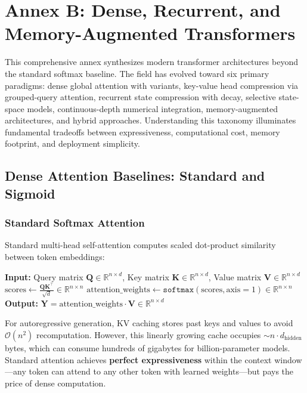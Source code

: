 \section{Annex B: Dense, Recurrent, and Memory-Augmented Transformers}
\label{sec:annex-transformer}

This comprehensive annex synthesizes modern transformer architectures beyond the standard softmax baseline. The field has evolved toward six primary paradigms: dense global attention with variants, key-value head compression via grouped-query attention, recurrent state compression with decay, selective state-space models, continuous-depth numerical integration, memory-augmented architectures, and hybrid approaches. Understanding this taxonomy illuminates fundamental tradeoffs between expressiveness, computational cost, memory footprint, and deployment simplicity.

\subsection{Dense Attention Baselines: Standard and Sigmoid}

\subsubsection{Standard Softmax Attention}
Standard multi-head self-attention \citep{vaswani_attention_2017} computes scaled dot-product similarity between token embeddings:

\begin{algorithmic}[1]
\State \textbf{Input:} Query matrix $\mathbf{Q} \in \mathbb{R}^{n \times d}$, Key matrix $\mathbf{K} \in \mathbb{R}^{n \times d}$, Value matrix $\mathbf{V} \in \mathbb{R}^{n \times d}$
\State $\text{scores} \gets \frac{\mathbf{Q}\mathbf{K}^\top}{\sqrt{d}} \in \mathbb{R}^{n \times n}$ 
\State $\text{attention\_weights} \gets \texttt{softmax}(\text{scores}, \text{axis}=1) \in \mathbb{R}^{n \times n}$ 
\State \textbf{Output:} $\mathbf{Y} = \text{attention\_weights} \cdot \mathbf{V} \in \mathbb{R}^{n \times d}$ 
\end{algorithmic}

For autoregressive generation, KV caching stores past keys and values to avoid $\mathcal{O}(n^2)$ recomputation. However, this linearly growing cache occupies $\sim n \cdot d_{\text{hidden}}$ bytes, which can consume hundreds of gigabytes for billion-parameter models. Standard attention achieves \textbf{perfect expressiveness} within the context window---any token can attend to any other token with learned weights---but pays the price of dense computation.

